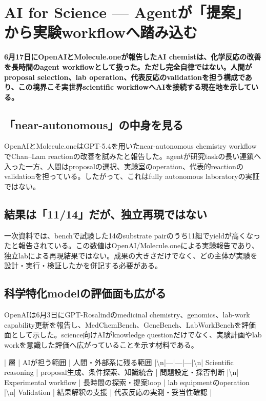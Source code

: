 \section{AI for Science — Agentが「提案」から実験workflowへ踏み込む}
\noindent\textbf{6月17日にOpenAIとMolecule.oneが報告したAI chemistは、化学反応の改善を長時間のagent workflowとして扱った。ただし完全自律ではない。人間がproposal selection、lab operation、代表反応のvalidationを担う構成であり、この境界こそ実世界scientific workflowへAIを接続する現在地を示している。}\autocite{src-5ff2f715f1e6}

\subsection{「near-autonomous」の中身を見る}

OpenAIとMolecule.oneはGPT-5.4を用いたnear-autonomous chemistry workflowでChan–Lam reactionの改善を試みたと報告した。agentが研究taskの長い連鎖へ入った一方、人間はproposalの選択、実験室のoperation、代表的reactionのvalidationを担っている。したがって、これはfully autonomous laboratoryの実証ではない。\autocite{src-5ff2f715f1e6}


\subsection{結果は「11/14」だが、独立再現ではない}

一次資料では、benchで試験した14のsubstrate pairのうち11組でyieldが高くなったと報告されている。この数値はOpenAI/Molecule.oneによる実験報告であり、独立labによる再現結果ではない。成果の大きさだけでなく、どの主体が実験を設計・実行・検証したかを併記する必要がある。\autocite{src-5ff2f715f1e6}


\subsection{科学特化modelの評価面も広がる}

OpenAIは6月3日にGPT-Rosalindのmedicinal chemistry、genomics、lab-work capability更新を報告し、MedChemBench、GeneBench、LabWorkBenchを評価面として示した。science向けAIがknowledge questionだけでなく、実験計画やlab workを意識した評価へ広がっていることを示す材料である。\autocite{src-ba562226725d}


| 層 | AIが担う範囲 | 人間・外部系に残る範囲 |\textbackslash{}n|---|---|---|\textbackslash{}n| Scientific reasoning | proposal生成、条件探索、知識統合 | 問題設定・採否判断 |\textbackslash{}n| Experimental workflow | 長時間の探索・提案loop | lab equipmentのoperation |\textbackslash{}n| Validation | 結果解釈の支援 | 代表反応の実測・妥当性確認 |\autocite{src-5ff2f715f1e6,src-ba562226725d}

